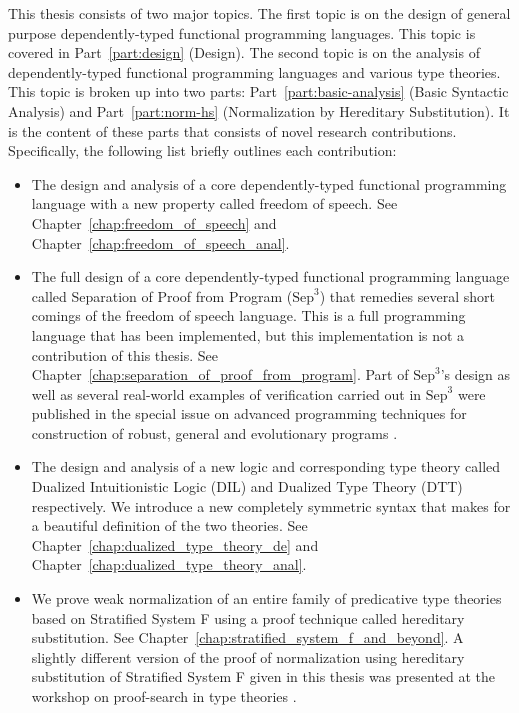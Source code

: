 \documentclass[phd,dedicationpage,ackpage,epigraphpage,figures]{uithesis}
\newcommand{\Sep}[0]{\text{Sep}^3}
\begin{document}
This thesis consists of two major topics.  The first topic is on the
design of general purpose dependently-typed functional programming
languages. This topic is covered in Part~\ref{part:design} (Design).
The second topic is on the analysis of dependently-typed functional
programming languages and various type theories.  This topic is broken
up into two parts: Part~\ref{part:basic-analysis} (Basic Syntactic
Analysis) and Part~\ref{part:norm-hs} (Normalization by Hereditary
Substitution).  It is the content of these parts that consists of
novel research contributions. Specifically, the following list briefly
outlines each contribution:
\begin{itemize}
\item The design and analysis of a core dependently-typed functional
  programming language with a new property called freedom of
  speech. See Chapter~\ref{chap:freedom_of_speech} and
  Chapter~\ref{chap:freedom_of_speech_anal}.

\item The full design of a core dependently-typed functional
  programming language called Separation of Proof from Program
  ($\Sep$) that remedies several short comings of the freedom of
  speech language.  This is a full programming language that has been
  implemented, but this implementation is not a contribution of this
  thesis.  See Chapter~\ref{chap:separation_of_proof_from_program}.
  Part of $\Sep$'s design as well as several real-world examples of
  verification carried out in $\Sep$ were published in the special
  issue on advanced programming techniques for construction of robust,
  general and evolutionary programs \cite{Kimmel:2012}.

\item The design and analysis of a new logic and corresponding type
  theory called Dualized Intuitionistic Logic (DIL) and Dualized Type
  Theory (DTT) respectively. We introduce a new completely symmetric
  syntax that makes for a beautiful definition of the two theories.
  See Chapter~\ref{chap:dualized_type_theory_de} and
  Chapter~\ref{chap:dualized_type_theory_anal}.

\item We prove weak normalization of an entire family of predicative
  type theories based on Stratified System F using a proof technique
  called hereditary substitution. See
  Chapter~\ref{chap:stratified_system_f_and_beyond}.  A slightly
  different version of the proof of normalization using hereditary
  substitution of Stratified System F given in this thesis was
  presented at the workshop on proof-search in type theories
  \cite{Eades:2010}.


\end{itemize}
\end{document}

